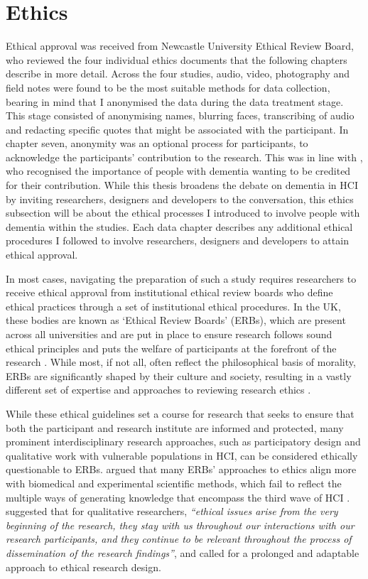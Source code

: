 \section{Ethics}
\label{Method:Ethics}
Ethical approval was received from Newcastle University Ethical Review Board, who reviewed the four individual ethics documents that the following chapters describe in more detail. Across the four studies, audio, video, photography and field notes were found to be the most suitable methods for data collection, bearing in mind that I anonymised the data during the data treatment stage. This stage consisted of anonymising names, blurring faces, transcribing of audio and redacting specific quotes that might be associated with the participant. In chapter seven, anonymity was an optional process for participants, to acknowledge the participants' contribution to the research. This was in line with \cite{hendriks_valuing_2018}, who recognised the importance of people with dementia wanting to be credited for their contribution. While this thesis broadens the debate on dementia in HCI by inviting researchers, designers and developers to the conversation, this ethics subsection will be about the ethical processes I introduced to involve people with dementia within the studies. Each data chapter describes any additional ethical procedures I followed to involve researchers, designers and developers to attain ethical approval.

In most cases, navigating the preparation of such a study requires researchers to receive ethical approval from institutional ethical review boards who define ethical practices through a set of institutional ethical procedures. In the UK, these bodies are known as ‘Ethical Review Boards’ (ERBs), which are present across all universities and are put in place to ensure research follows sound ethical principles and puts the welfare of participants at the forefront of the research \citep{pachana_can_2014}. While most, if not all, often reflect the philosophical basis of morality, ERBs are significantly shaped by their culture and society, resulting in a vastly different set of expertise and approaches to reviewing research ethics \citep{flicker_ethical_2007}.

While these ethical guidelines set a course for research that seeks to ensure that both the participant and research institute are informed and protected, many prominent interdisciplinary research approaches, such as participatory design and qualitative work with vulnerable populations in HCI, can be considered ethically questionable to ERBs. \cite{bell_censorship_2014} argued that many ERBs’ approaches to ethics align more with biomedical and experimental scientific methods, which fail to reflect the multiple ways of generating knowledge that encompass the third wave of HCI \citep{bodker_when_2006,lazar_critical_2017}. \cite{carla_introducing_2013} suggested that for qualitative researchers,\textit{ ``ethical issues arise from the very beginning of the research, they stay with us throughout our interactions with our research participants, and they continue to be relevant throughout the process of dissemination of the research findings''}, and called for a prolonged and adaptable approach to ethical research design. 

